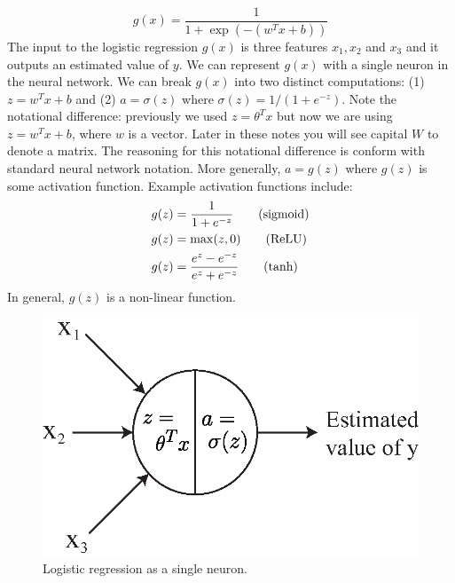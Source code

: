 \documentclass{article}
\numberwithin{equation}{section}
\begin{document}
\begin{equation*}
g(x) = \frac{1}{1+\exp(-(w^Tx+b))}
\end{equation*}
The input to the logistic regression $g(x)$ is three features $x_1, x_2$ and $x_3$ and it outputs an estimated value of $y$. We can represent $g(x)$ with a single neuron in the neural network. We can break $g(x)$ into two distinct computations: (1) $z= w^T x + b $ and (2) $a = \sigma(z)$ where $\sigma(z) = 1/(1+e^{-z})$. Note the notational difference: previously we used $z=\theta^T x$ but now we are using $z=w^T x + b$, where $w$ is a vector. Later in these notes you will see capital $W$ to denote a matrix. The reasoning for this notational difference is conform with standard neural network notation. More generally, $a= g(z)$ where $g(z)$ is some activation function. Example activation functions include:
\begin{align}
g(z) &= \frac{1}{1+e^{-z}} \textrm{\qquad (sigmoid)} \\
g(z) &= \max(z, 0) \textrm{\qquad (ReLU)} \\
g(z) &= \frac{e^z-e^{-z}}{e^z + e^{-z}} \textrm{\qquad (tanh)}
\end{align}
In general, $g(z)$ is a non-linear function.
\begin{figure}[h]
	\centering
	\includegraphics[width=0.5\linewidth]{single_neuron.eps}
	\caption{Logistic regression as a single neuron.}\label{fig:single}
\end{figure}
\end{document}
